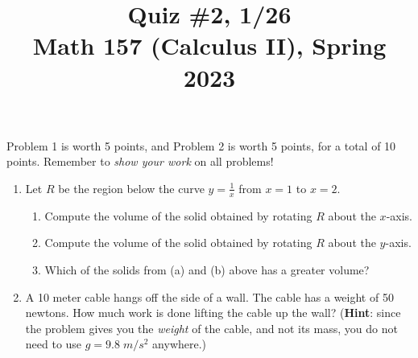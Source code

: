 \documentclass[11pt]{article}
\title{Quiz \#2, 1/26 \\ Math 157 (Calculus II), Spring 2023}
\date{}
\begin{document}
\maketitle

\thispagestyle{empty}

\vspace{-2cm}

Problem 1 is worth 5 points, and Problem 2 is worth 5 points, for a total of 10 points. Remember to \emph{show your work} on all problems!

\begin{enumerate}
\item Let $R$ be the region below the curve $y=\frac{1}{x}$ from $x=1$ to $x=2$.
\begin{enumerate}
\item Compute the volume of the solid obtained by rotating $R$ about the $x$-axis.
\item Compute the volume of the solid obtained by rotating $R$ about the $y$-axis.
\item Which of the solids from (a) and (b) above has a greater volume?
\end{enumerate}

\vspace{8cm}

\item A 10 meter cable hangs off the side of a wall. The cable has a weight of 50 newtons. How much work is done lifting the cable up the wall? ({\bf Hint}: since the problem gives you the \emph{weight} of the cable, and not its mass, you do not need to use $g=9.8 \; m/s^2$ anywhere.)

\end{enumerate}
\end{document}
